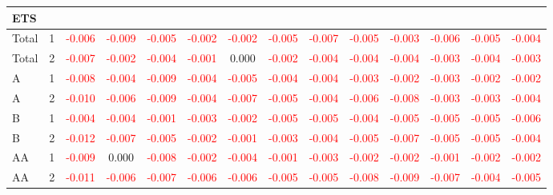\begin{table}[!htb]
{\begin{tabular}{llcccccccccccc}
\hline
ETS &  &  &  &  &  &  &  &  &  &  &  &  & \\
\hline
Total & 1 & \textcolor{red}{-0.006} & \textcolor{red}{-0.009} & \textcolor{red}{-0.005} & \textcolor{red}{-0.002} & \textcolor{red}{-0.002} & \textcolor{red}{-0.005} & \textcolor{red}{-0.007} & \textcolor{red}{-0.005} & \textcolor{red}{-0.003} & \textcolor{red}{-0.006} & \textcolor{red}{-0.005} & \textcolor{red}{-0.004}\\
Total & 2 & \textcolor{red}{-0.007} & \textcolor{red}{-0.002} & \textcolor{red}{-0.004} & \textcolor{red}{-0.001} & 0.000 & \textcolor{red}{-0.002} & \textcolor{red}{-0.004} & \textcolor{red}{-0.004} & \textcolor{red}{-0.004} & \textcolor{red}{-0.003} & \textcolor{red}{-0.004} & \textcolor{red}{-0.003}\\
A & 1 & \textcolor{red}{-0.008} & \textcolor{red}{-0.004} & \textcolor{red}{-0.009} & \textcolor{red}{-0.004} & \textcolor{red}{-0.005} & \textcolor{red}{-0.004} & \textcolor{red}{-0.004} & \textcolor{red}{-0.003} & \textcolor{red}{-0.002} & \textcolor{red}{-0.003} & \textcolor{red}{-0.002} & \textcolor{red}{-0.002}\\
A & 2 & \textcolor{red}{-0.010} & \textcolor{red}{-0.006} & \textcolor{red}{-0.009} & \textcolor{red}{-0.004} & \textcolor{red}{-0.007} & \textcolor{red}{-0.005} & \textcolor{red}{-0.004} & \textcolor{red}{-0.006} & \textcolor{red}{-0.008} & \textcolor{red}{-0.003} & \textcolor{red}{-0.003} & \textcolor{red}{-0.004}\\
B & 1 & \textcolor{red}{-0.004} & \textcolor{red}{-0.004} & \textcolor{red}{-0.001} & \textcolor{red}{-0.003} & \textcolor{red}{-0.002} & \textcolor{red}{-0.005} & \textcolor{red}{-0.005} & \textcolor{red}{-0.004} & \textcolor{red}{-0.005} & \textcolor{red}{-0.005} & \textcolor{red}{-0.005} & \textcolor{red}{-0.006}\\
B & 2 & \textcolor{red}{-0.012} & \textcolor{red}{-0.007} & \textcolor{red}{-0.005} & \textcolor{red}{-0.002} & \textcolor{red}{-0.001} & \textcolor{red}{-0.003} & \textcolor{red}{-0.004} & \textcolor{red}{-0.005} & \textcolor{red}{-0.007} & \textcolor{red}{-0.005} & \textcolor{red}{-0.005} & \textcolor{red}{-0.004}\\
AA & 1 & \textcolor{red}{-0.009} & 0.000 & \textcolor{red}{-0.008} & \textcolor{red}{-0.002} & \textcolor{red}{-0.004} & \textcolor{red}{-0.001} & \textcolor{red}{-0.003} & \textcolor{red}{-0.002} & \textcolor{red}{-0.002} & \textcolor{red}{-0.001} & \textcolor{red}{-0.002} & \textcolor{red}{-0.002}\\
AA & 2 & \textcolor{red}{-0.011} & \textcolor{red}{-0.006} & \textcolor{red}{-0.007} & \textcolor{red}{-0.006} & \textcolor{red}{-0.006} & \textcolor{red}{-0.005} & \textcolor{red}{-0.005} & \textcolor{red}{-0.008} & \textcolor{red}{-0.009} & \textcolor{red}{-0.007} & \textcolor{red}{-0.004} & \textcolor{red}{-0.005}\\

\end{tabular}}
\end{table}
